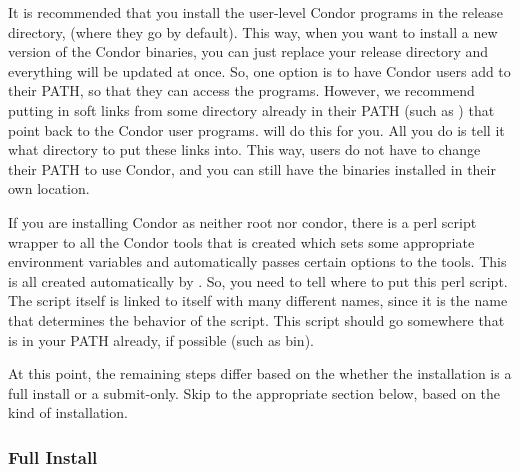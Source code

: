 \begin{description}
     It is recommended that you install the user-level Condor programs
     in the release directory, (where they go by default).  This way,
     when you want to install a new version of the Condor binaries,
     you can just replace your release directory and everything will
     be updated at once.  So, one option is to have Condor users add
      to their PATH, so that they can access the
     programs.  However, we recommend putting in soft links from some
     directory already in their PATH (such as ) that
     point back to the Condor user programs.   will do
     this for you. All you do is tell it what directory to put
     these links into.  This way, users do not have to change their
     PATH to use Condor, and you can still have the binaries installed
     in their own location.

     If you are installing Condor as neither root nor condor, there is
     a perl script wrapper to all the Condor tools that is created
     which sets some appropriate environment variables and
     automatically passes certain options to the tools.  This is all
     created automatically by .  So, you need to tell
      where to put this perl script.  The script itself
     is linked to itself with many different names, since it is the
     name that determines the behavior of the script.  This script
     should go somewhere that is in your PATH already, if possible
     (such as \Tilde bin).

\end{description}

At this point, the remaining steps differ based on the
whether the installation is a full install or a submit-only.
Skip to the appropriate section below, based on the kind of installation.

\subsubsection{Full Install}


